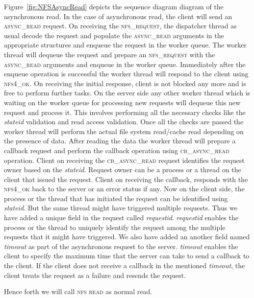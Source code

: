 Figure~\ref{fig:NFSAsyncRead} depicts the sequence diagram diagram of the asynchronous read. In the case of asynchronous read, the client will send an \textsc{async\_read} request. On receiving the \textsc{nfs\_request}, the dispatcher thread as usual decode the request and populate the \textsc{async\_read} arguments in the appropriate structures and enqueue the request in the worker queue. The worker thread will dequeue the request and prepare an \textsc{nfs\_request} with the \textsc{async\_read} arguments and enqueue in the worker queue. Immediately after the enqueue operation is successful the worker thread will respond to the client using \textsc{nfs4\_ok}. On receiving the initial response, client is not blocked any more and is free to perform further tasks. On the server side any other worker thread which is waiting on the worker queue for processing new requests will dequeue this new request and process it. This involves performing all the necessary checks like the \textit{stateid} validation and read access validation. Once all the checks are passed the worker thread will perform the actual file system read/cache read depending on the presence of data. After reading the data the worker thread will prepare a callback request and perform the callback operation using \textsc{cb\_async\_read} operation. Client on receiving the \textsc{cb\_async\_read} request identifies the request owner based on the \textit{stateid}. Request owner can  be a process or a thread on the client that issued the request. Client on receiving the callback, responds with the \textsc{nfs4\_ok} back to the server or an error status if any. Now on the client side, the process or the thread that has initiated the request can be identified using \textit{stateid}. But the same thread might have triggered multiple requests. Thus we have added a unique field in the request called \textit{requestid}.  \textit{requestid} enables the process or the thread to uniquely identify the request among the multiple requests that it might have triggered. We also have added an another field named  \textit{timeout} as part of  the asynchronous request to the server. \textit{timeout} enables the client to specify the maximum time that the server can take to send a callback to the client. If the client does not receive a callback in the mentioned  \textit{timeout}, the client treats the request as a failure and resends the request.

Hence forth we will call \textsc{nfs read} as normal read.





